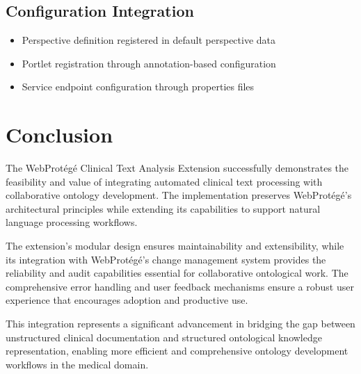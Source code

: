 \subsection{Configuration Integration}
\begin{itemize}
\item Perspective definition registered in default perspective data
\item Portlet registration through annotation-based configuration
\item Service endpoint configuration through properties files
\end{itemize}

\section{Conclusion}

The WebProtégé Clinical Text Analysis Extension successfully demonstrates the feasibility and value of integrating automated clinical text processing with collaborative ontology development. The implementation preserves WebProtégé's architectural principles while extending its capabilities to support natural language processing workflows.

The extension's modular design ensures maintainability and extensibility, while its integration with WebProtégé's change management system provides the reliability and audit capabilities essential for collaborative ontological work. The comprehensive error handling and user feedback mechanisms ensure a robust user experience that encourages adoption and productive use.

This integration represents a significant advancement in bridging the gap between unstructured clinical documentation and structured ontological knowledge representation, enabling more efficient and comprehensive ontology development workflows in the medical domain.
